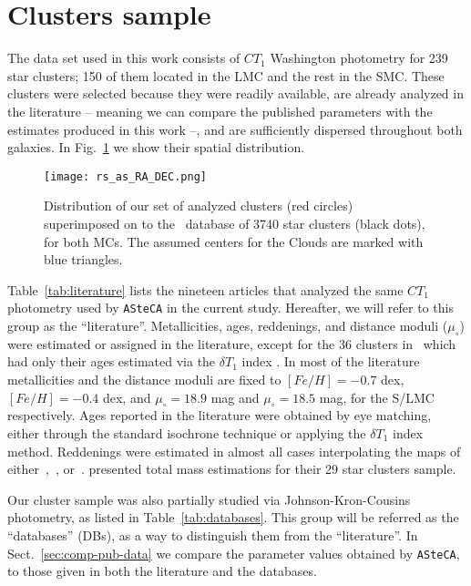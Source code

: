 \documentclass{aa}
\begin{document}

\section{Clusters sample}
\label{sec:clust-sample}

The data set used in this work consists of $CT_1$ Washington photometry for 239
star clusters; 150 of them located in the LMC and the rest in the SMC.\@
%
These clusters were selected because they were readily available, are
already analyzed in the literature -- meaning we can compare the published
parameters with the estimates produced in this work --, and are sufficiently
dispersed throughout both galaxies. In Fig.~\ref{fig:ra-dec} we show their
spatial distribution.

\begin{figure}
\centering
\texttt{[image: rs\_as\_RA\_DEC.png]}
\caption{Distribution of our set of analyzed clusters (red circles)
superimposed on to the~\cite{Bica_2008} database of 3740 star clusters (black
dots), for both MCs. The assumed centers for the Clouds are marked with blue
triangles.}
\label{fig:ra-dec}
\end{figure}

Table~\ref{tab:literature} lists the nineteen articles that analyzed the same
$CT_1$ photometry used by \texttt{ASteCA} in the current study. Hereafter, we
will refer to this group as the ``literature''.
%
Metallicities, ages, reddenings, and distance moduli ($\mu_{\circ}$)
were estimated or assigned in the literature, except for the 36
clusters in~\cite{Piatti_2011b} which had only their ages estimated
via the $\delta T_1$ index \citep{Phelps_1994,Geisler_1997}.
%
In most of the literature metallicities and the distance moduli are fixed to
$[Fe/H]{=}-0.7$ dex, $[Fe/H]{=}-0.4$ dex, and $\mu_{\circ}{=}18.9$ mag and
$\mu_{\circ}{=}18.5$ mag, for the S/LMC respectively.
Ages reported in the literature were obtained by eye matching, either through
the standard isochrone technique or applying the $\delta T_1$ index method.
Reddenings were estimated in almost all cases interpolating the maps
of either~\cite{Burstein_1982},~\cite{Schlegel_1998}, or~\cite{Haschke_2011}.
\cite{Maia_2013} presented total mass estimations for their 29 star clusters
sample.

Our cluster sample was also partially studied via Johnson-Kron-Cousins
photometry, as listed in Table~\ref{tab:databases}. This group will be referred
as the ``databases'' (DBs), as a way to distinguish them from the
``literature''. In Sect.~\ref{sec:comp-pub-data} we compare the parameter
values obtained by \texttt{ASteCA}, to those given in both the literature and
the databases.
\end{document}
